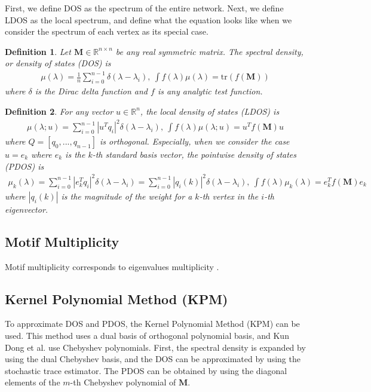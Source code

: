 \documentclass[senior,final,11pt]{iscs-thesis}
\newtheorem{definition}{Definition}
\begin{document}
First, we define DOS as the spectrum of the entire network. Next, we define LDOS as the local spectrum, and define what the equation looks like when we consider the spectrum of each vertex as its special case.
\begin{definition}
    Let ${\mathbf M} \in \mathbb{R}^{n\times n}$ be any real symmetric matrix. The spectral density, or density of states (DOS) is
    \begin{align}
        \mu(\lambda) = \frac{1}{n}\sum_{i=0}^{n-1} \delta(\lambda - \lambda_i), ~ \int f(\lambda)\mu(\lambda)= \mathrm{tr}(f({\mathbf M}))
    \end{align}
    where $\delta$ is the Dirac delta function and $f$ is any analytic test function.
\end{definition}
\begin{definition}
    For any vector $u \in \mathbb{R}^n$, the local density of states (LDOS) is
    \begin{align}
        \mu(\lambda ; u) = \sum_{i=0}^{n-1} |u^T q_i|^2 \delta(\lambda - \lambda_i), ~ \int f(\lambda) \mu(\lambda; u) = u^T f({\mathbf M}) u
    \end{align}
    where $Q=[q_0, ..., q_{n-1}]$ is orthogonal.
    Especially, when we consider the case $u=e_k$ where $e_k$ is the $k$-th standard basis vector, the pointwise density of states (PDOS) is
    \begin{align}
        \mu_k(\lambda) = \sum_{i=0}^{n-1} |e_k^T q_i|^2 \delta(\lambda - \lambda_i) = \sum_{i=0}^{n-1} |q_i(k)|^2 \delta(\lambda - \lambda_i), ~ \int f(\lambda) \mu_k(\lambda) = e_k^T f({\mathbf M}) e_k
    \end{align}
    where $|q_i(k)|$ is the magnitude of the weight for a $k$-th vertex in the $i$-th eigenvector.
\end{definition}


\subsection{Motif Multiplicity}
Motif multiplicity corresponds to eigenvalues multiplicity \cite{mehatari2015effect,dong2019network}.

\subsection{Kernel Polynomial Method (KPM)}
To approximate DOS and PDOS, the Kernel Polynomial Method (KPM) \cite{weisse2006kernel} can be used. This method uses a dual basis of orthogonal polynomial basis, and Kun Dong et al.\cite{dong2019network} use Chebyshev polynomials. First, the spectral density is expanded by using the dual Chebyshev basis, and the DOS can be approximated by using the stochastic trace estimator. The PDOS can be obtained by using the diagonal elements of the $m$-th Chebyshev polynomial of ${\mathbf M}$.
\end{document}
